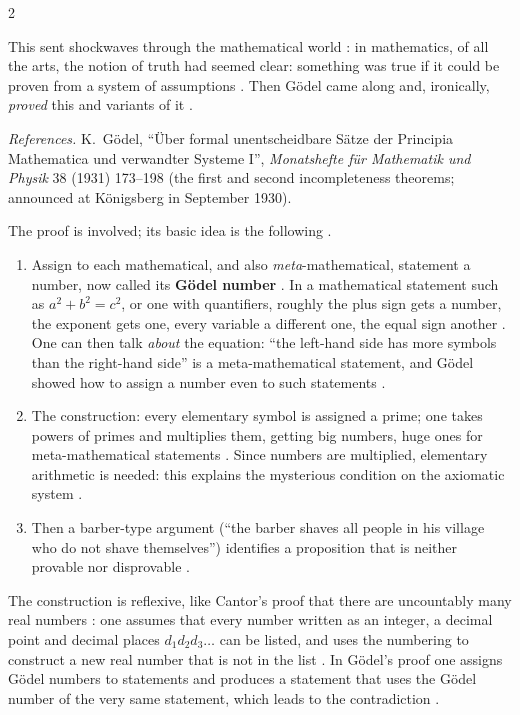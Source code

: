 \begin{paracol}{2}
\begin{history}
This sent shockwaves through the mathematical world : in mathematics, of all the arts, the notion
of truth had seemed clear: something was true if it could be proven from a system of assumptions
. Then G\"odel came along and, ironically, \emph{proved} this and variants of it
.\par
\smallskip
\emph{References.} K.~G\"odel, ``\"Uber formal unentscheidbare S\"atze der Principia Mathematica und verwandter
Systeme I'', \emph{Monatshefte f\"ur Mathematik und Physik} 38 (1931) 173--198 (the first and second
incompleteness theorems; announced at K\"onigsberg in September 1930).
\end{history}

\begin{secondary}
The proof is involved; its basic idea is the following .
\begin{enumerate}
  \item Assign to each mathematical, and also \emph{meta}-mathematical, statement a number, now called its
        \textbf{G\"odel number} . In a mathematical statement such as $a^2+b^2=c^2$, or one with
        quantifiers, roughly the plus sign gets a number, the exponent gets one, every variable a different one,
        the equal sign another . One can then talk \emph{about} the equation: ``the left-hand
        side has more symbols than the right-hand side'' is a meta-mathematical statement, and G\"odel showed how
        to assign a number even to such statements .
  \item The construction: every elementary symbol is assigned a prime; one takes powers of primes and multiplies
        them, getting big numbers, huge ones for meta-mathematical statements . Since numbers are
        multiplied, elementary arithmetic is needed: this explains the mysterious condition on the axiomatic
        system .
  \item Then a barber-type argument (``the barber shaves all people in his village who do not shave themselves'')
        identifies a proposition that is neither provable nor disprovable .
\end{enumerate}
The construction is reflexive, like Cantor's proof that there are uncountably many real numbers
: one assumes that every number written as an integer, a decimal point and decimal places
$d_1d_2d_3\dots$ can be listed, and uses the numbering to construct a new real number that is not in the list
. In G\"odel's proof one assigns G\"odel numbers to statements and produces a statement that uses
the G\"odel number of the very same statement, which leads to the contradiction .
\end{secondary}


\end{paracol}
